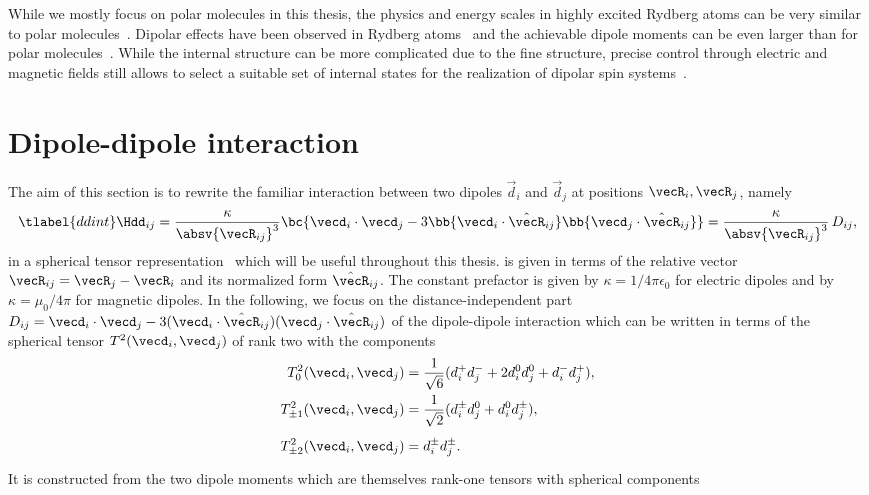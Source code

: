 While we mostly focus on polar molecules in this thesis, the physics and energy scales in highly
excited Rydberg atoms can be very similar to polar molecules~\cite{Low2012}. Dipolar effects have
been observed in Rydberg atoms~\cite{Westermann2006,Nipper2012b,Barredo2014,Ravets2015} and the
achievable dipole moments can be even larger than for polar molecules~\cite{Booth2014}. While
the internal structure can be more complicated due to the fine structure, precise control through
electric and magnetic fields still allows to select a suitable set of internal states for the
realization of dipolar spin systems~\cite{Barredo2014,Weber2015}.

\section{Dipole-dipole interaction}
The aim of this section is to rewrite the familiar interaction between two dipoles $\vec{d}_i$ and $\vec{d}_j$ at positions $\vecR_i, \vecR_j$, namely
\begin{align} \tlabel{ddint}
    \Hdd_{ij} = \frac{\kappa}{\absv{\vecR_{ij}}^3} \bc{ \vecd_i \cdot \vecd_j -3 \bb{ \vecd_i \cdot \hat{\vecR}_{ij} }\bb{ \vecd_j \cdot \hat{\vecR}_{ij} } } = \frac{\kappa}{\absv{\vecR_{ij}}^3} \, D_{ij},
\end{align}
in a spherical tensor representation~\cite{Micheli2007,Gorshkov2011c} which will be useful throughout this thesis.
 is given in terms of the relative vector $\vecR_{ij} = \vecR_j - \vecR_i$ and its normalized form $\hat{\vecR}_{ij}$.
The constant prefactor is given by $\kappa = 1/4\pi\epsilon_0$ for electric dipoles and by
$\kappa = \mu_0 / 4\pi$ for magnetic dipoles.
In the following, we focus on the distance-independent part $D_{ij} = \vecd_i \cdot \vecd_j -3 (\vecd_i \cdot \hat{\vecR}_{ij})(\vecd_j \cdot \hat{\vecR}_{ij})$ of the dipole-dipole interaction which can be written in terms of the spherical tensor $T^2(\vecd_i, \vecd_j)$ of rank two with the components
\begin{align}
T^2_0(\vecd_i, \vecd_j) &= \frac{1}{\sqrt{6}} (d_i^+ d_j^- + 2d_i^0 d_j^0 + d_i^{-} d_j^{+}), \\
T^2_{\pm 1}(\vecd_i, \vecd_j) &= \frac{1}{\sqrt{2}} (d_i^{\pm} d_j^0 + d_i^0 d_j^{\pm}), \\
T^2_{\pm 2}(\vecd_i, \vecd_j) &= d_i^{\pm} d_j^{\pm} \vphantom{\frac{1}{42}}.
\end{align}
It is constructed from the two dipole moments which are themselves rank-one tensors with spherical components
